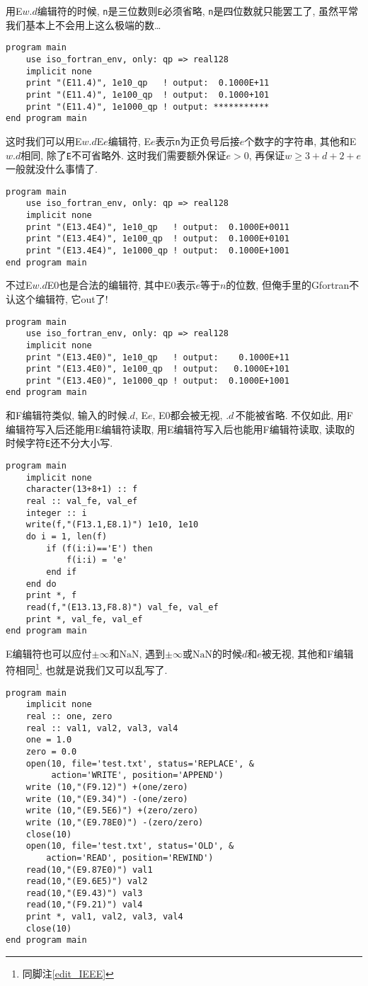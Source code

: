 用E$w.d$编辑符的时候, \texttt{n}是三位数则\texttt{E}必须省略, \texttt{n}是四位数就只能罢工了, 虽然平常我们基本上不会用上这么极端的数\dots
\begin{lstlisting}
program main
    use iso_fortran_env, only: qp => real128
    implicit none
    print "(E11.4)", 1e10_qp   ! output:  0.1000E+11
    print "(E11.4)", 1e100_qp  ! output:  0.1000+101
    print "(E11.4)", 1e1000_qp ! output: ***********
end program main
\end{lstlisting}
这时我们可以用E$w.d$E$e$编辑符, E$e$表示\texttt{n}为正负号后接$e$个数字的字符串, 其他和E$w.d$相同, 除了\texttt{E}不可省略外. 这时我们需要额外保证$e>0$, 再保证$w\geqslant 3+d+2+e$一般就没什么事情了.
\begin{lstlisting}
program main
    use iso_fortran_env, only: qp => real128
    implicit none
    print "(E13.4E4)", 1e10_qp   ! output:  0.1000E+0011
    print "(E13.4E4)", 1e100_qp  ! output:  0.1000E+0101
    print "(E13.4E4)", 1e1000_qp ! output:  0.1000E+1001
end program main
\end{lstlisting}
不过E$w.d$E0也是合法的编辑符, 其中E0表示$e$等于$n$的位数, 但俺手里的Gfortran不认这个编辑符, 它out了!
\begin{lstlisting}
program main
    use iso_fortran_env, only: qp => real128
    implicit none
    print "(E13.4E0)", 1e10_qp   ! output:    0.1000E+11
    print "(E13.4E0)", 1e100_qp  ! output:   0.1000E+101
    print "(E13.4E0)", 1e1000_qp ! output:  0.1000E+1001
end program main
\end{lstlisting}

和F编辑符类似, 输入的时候$.d$, E$e$, E0都会被无视, $.d\,$不能被省略. 不仅如此, 用F编辑符写入后还能用E编辑符读取, 用E编辑符写入后也能用F编辑符读取, 读取的时候字符\texttt{E}还不分大小写.
\begin{lstlisting}
program main
    implicit none
    character(13+8+1) :: f
    real :: val_fe, val_ef
    integer :: i
    write(f,"(F13.1,E8.1)") 1e10, 1e10
    do i = 1, len(f)
        if (f(i:i)=='E') then
            f(i:i) = 'e'
        end if
    end do
    print *, f
    read(f,"(E13.13,F8.8)") val_fe, val_ef
    print *, val_fe, val_ef
end program main
\end{lstlisting}

E编辑符也可以应付$\pm\infty$和$\text{NaN}$, 遇到$\pm\infty$或$\text{NaN}$的时候$d$和$e$被无视, 其他和F编辑符相同\footnote{同脚注\ref{edit_IEEE}}, 也就是说我们又可以乱写了.
\begin{lstlisting}
program main
    implicit none
    real :: one, zero
    real :: val1, val2, val3, val4
    one = 1.0
    zero = 0.0
    open(10, file='test.txt', status='REPLACE', &
         action='WRITE', position='APPEND')
    write (10,"(F9.12)") +(one/zero)
    write (10,"(E9.34)") -(one/zero)
    write (10,"(E9.5E6)") +(zero/zero)
    write (10,"(E9.78E0)") -(zero/zero)
    close(10)
    open(10, file='test.txt', status='OLD', &
        action='READ', position='REWIND')
    read(10,"(E9.87E0)") val1
    read(10,"(E9.6E5)") val2
    read(10,"(E9.43)") val3
    read(10,"(F9.21)") val4
    print *, val1, val2, val3, val4
    close(10)
end program main
\end{lstlisting}

